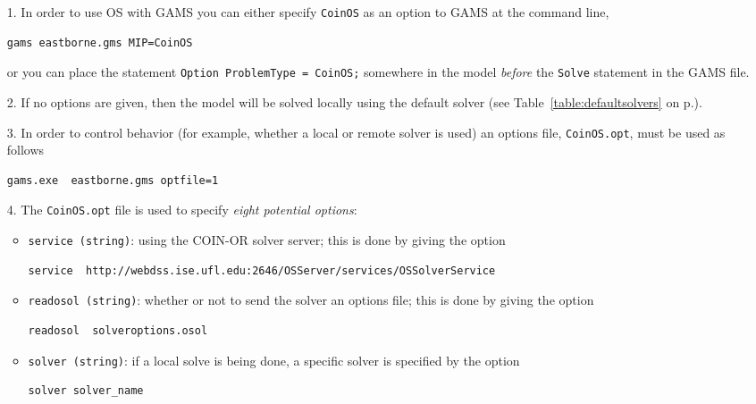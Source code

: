 \begin{enumerate}

\item[1.]   In order to use OS with GAMS you can either specify {\tt CoinOS} as an option to GAMS 
at the command line,
\begin{verbatim}
gams eastborne.gms MIP=CoinOS
\end{verbatim}
or you can  place the statement {\tt Option ProblemType = CoinOS;} somewhere in the model {\it before} 
the {\tt Solve} statement in the GAMS file.


\item[2.]   If no options are given, then the model will be solved locally using the default solver 
(see Table~\ref{table:defaultsolvers} on p.\pageref{table:defaultsolvers}).

\item[3.] In order to control behavior (for example, whether a local or remote solver is used)  an options
 file,  {\tt CoinOS.opt}, must be used as follows

\begin{verbatim}
gams.exe  eastborne.gms optfile=1
\end{verbatim}

\item[4.]  The  {\tt CoinOS.opt} file is used to specify {\it eight potential options}:


\begin{itemize}
\item {\tt service (string)}: using the COIN-OR solver server; this is done by giving the option

\begin{verbatim}
service  http://webdss.ise.ufl.edu:2646/OSServer/services/OSSolverService
\end{verbatim}


\item  {\tt readosol (string)}: whether or not to send the solver an options file; this is done by 
giving the option
\begin{verbatim}
readosol  solveroptions.osol
\end{verbatim}


\item   {\tt solver (string)}: if a local solve is being done,  a specific solver is specified by 
the option
\begin{verbatim}
solver solver_name
\end{verbatim}


\end{itemize}
\end{enumerate}
